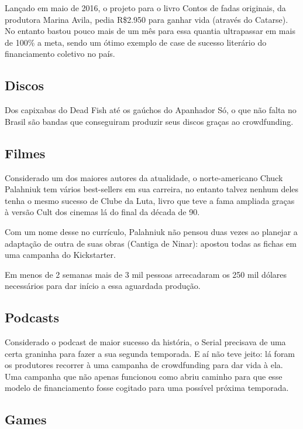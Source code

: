 \documentclass{classe_cn}                 %
\begin{document}
Lançado em maio de 2016, o projeto para o livro Contos de fadas originais, da produtora Marina Avila, pedia R\$2.950 para ganhar vida (através do Catarse). No entanto bastou pouco mais de um mês para essa quantia ultrapassar em mais de 100\% a meta, sendo um ótimo exemplo de case de sucesso literário do financiamento coletivo no país.

\subsection{Discos}

Dos capixabas do Dead Fish até os gaúchos do Apanhador Só, o que não falta no Brasil são bandas que conseguiram produzir seus discos graças ao crowdfunding.

\subsection{Filmes}

Considerado um dos maiores autores da atualidade, o norte-americano Chuck Palahniuk tem vários best-sellers em sua carreira, no entanto talvez nenhum deles tenha o mesmo sucesso de Clube da Luta, livro que teve a fama ampliada graças à versão Cult dos cinemas lá do final da década de 90.

Com um nome desse no currículo, Palahniuk não pensou duas vezes ao planejar a adaptação de outra de suas obras (Cantiga de Ninar): apostou todas as fichas em uma campanha do Kickstarter.

Em menos de 2 semanas mais de 3 mil pessoas arrecadaram os 250 mil dólares necessários para dar início a essa aguardada produção.

\subsection{Podcasts}

Considerado o podcast de maior sucesso da história, o Serial precisava de uma certa graninha para fazer a sua segunda temporada. E aí não teve jeito: lá foram os produtores recorrer à uma campanha de crowdfunding para dar vida à ela. Uma campanha que não apenas funcionou como abriu caminho para que esse modelo de financiamento fosse cogitado para uma possível próxima temporada.

\subsection{Games}
\end{document}
